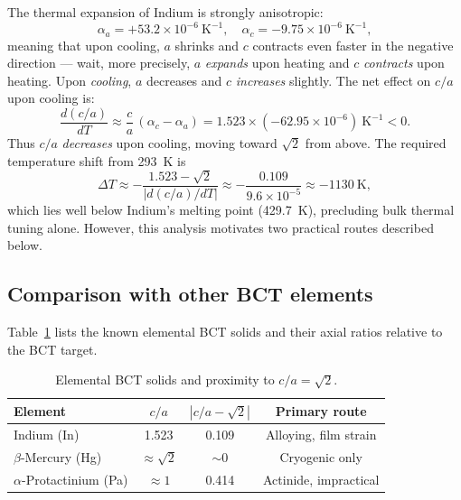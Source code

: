 \documentclass[aps,prl,twocolumn,superscriptaddress,floatfix]{revtex4-2}
\begin{document}
The thermal expansion of Indium is strongly anisotropic:
\begin{equation}
  \alpha_a = +53.2\times10^{-6}\ \mathrm{K}^{-1}, \quad
  \alpha_c = -9.75\times10^{-6}\ \mathrm{K}^{-1},
\end{equation}
meaning that upon cooling, $a$ shrinks and $c$ contracts even faster
in the negative direction --- wait, more precisely, $a$ \emph{expands}
upon heating and $c$ \emph{contracts} upon heating.
Upon \emph{cooling}, $a$ decreases and $c$ \emph{increases} slightly.
The net effect on $c/a$ upon cooling is:
\begin{equation}
  \frac{d(c/a)}{dT} \approx \frac{c}{a}\,(\alpha_c - \alpha_a)
  = 1.523 \times (-62.95\times10^{-6})\ \mathrm{K}^{-1} < 0.
\end{equation}
Thus $c/a$ \emph{decreases} upon cooling, moving toward $\sqrt{2}$
from above.
The required temperature shift from 293~K is
\begin{equation}
  \Delta T \approx -\frac{1.523 - \sqrt{2}}{|d(c/a)/dT|}
  \approx -\frac{0.109}{9.6\times10^{-5}} \approx -1130\ \mathrm{K},
\end{equation}
which lies well below Indium's melting point (429.7~K), precluding
bulk thermal tuning alone.
However, this analysis motivates two practical routes described below.

\subsection{Comparison with other BCT elements}

Table~\ref{tab:bct_candidates} lists the known elemental BCT solids
and their axial ratios relative to the BCT target.

\begin{table}[h]
\centering
\caption{Elemental BCT solids and proximity to $c/a = \sqrt{2}$.}
\label{tab:bct_candidates}
\begin{tabular}{lccc}
\toprule
Element & $c/a$ & $|c/a - \sqrt{2}|$ & Primary route \\
\midrule
Indium (In) & 1.523 & 0.109 & Alloying, film strain \\
$\beta$-Mercury (Hg) & $\approx\sqrt{2}$ & $\sim 0$ & Cryogenic only \\
$\alpha$-Protactinium (Pa) & $\approx 1$ & 0.414 & Actinide, impractical \\
\bottomrule
\end{tabular}
\end{table}
\end{document}
